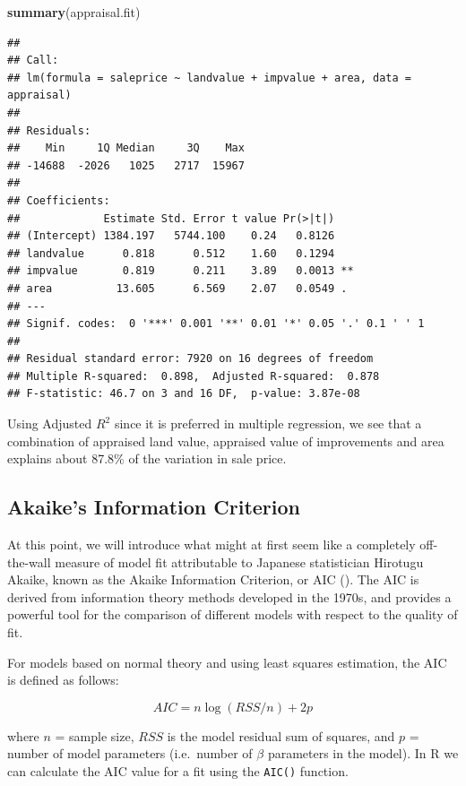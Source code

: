 \documentclass[
]{book}
\newenvironment{Shaded}{\begin{snugshade}}{\end{snugshade}}
\newcommand{\FunctionTok}[1]{\textcolor[rgb]{0.13,0.29,0.53}{\textbf{#1}}}
\newcommand{\NormalTok}[1]{#1}
\begin{document}
\begin{Shaded}
\begin{Highlighting}[]
\FunctionTok{summary}\NormalTok{(appraisal.fit)}
\end{Highlighting}
\end{Shaded}

\begin{verbatim}
## 
## Call:
## lm(formula = saleprice ~ landvalue + impvalue + area, data = appraisal)
## 
## Residuals:
##    Min     1Q Median     3Q    Max 
## -14688  -2026   1025   2717  15967 
## 
## Coefficients:
##             Estimate Std. Error t value Pr(>|t|)   
## (Intercept) 1384.197   5744.100    0.24   0.8126   
## landvalue      0.818      0.512    1.60   0.1294   
## impvalue       0.819      0.211    3.89   0.0013 **
## area          13.605      6.569    2.07   0.0549 . 
## ---
## Signif. codes:  0 '***' 0.001 '**' 0.01 '*' 0.05 '.' 0.1 ' ' 1
## 
## Residual standard error: 7920 on 16 degrees of freedom
## Multiple R-squared:  0.898,  Adjusted R-squared:  0.878 
## F-statistic: 46.7 on 3 and 16 DF,  p-value: 3.87e-08
\end{verbatim}

Using Adjusted \(R^2\) since it is preferred in multiple regression, we see that a combination of appraised land value, appraised value of improvements and area explains about 87.8\% of the variation in sale price.

\hypertarget{akaikes-information-criterion}{%
\subsection{Akaike's Information Criterion}\label{akaikes-information-criterion}}

At this point, we will introduce what might at first seem like a completely off-the-wall measure of model fit attributable to Japanese statistician Hirotugu Akaike, known as the Akaike Information Criterion, or AIC (\citet{akaike1973information}).
The AIC is derived from information theory methods developed in the 1970s, and provides a powerful tool for the comparison of different models with respect to the quality of fit.

For models based on normal theory and using least squares estimation, the AIC is defined as follows:

\[AIC = n\log(RSS/n) + 2p\]

where \(n\) = sample size, \(RSS\) is the model residual sum of squares, and \(p\) = number of model parameters (i.e.~number of \(\beta\) parameters in the model).
In R we can calculate the AIC value for a fit using the \texttt{AIC()} function.
\end{document}

